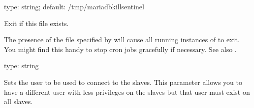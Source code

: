\documentclass[letterpaper,10pt,english]{sphinxmanual}
\begin{document}

\begin{fulllineitems}
\label{\detokenize{mariadb-kill:cmdoption-mariadb-kill-sentinel}}
type: string; default: /tmp/mariadb\sphinxhyphen{}kill\sphinxhyphen{}sentinel

Exit if this file exists.

The presence of the file specified by {\hyperref[\detokenize{mariadb-kill:cmdoption-mariadb-kill-sentinel}]{}} will cause all
running instances of  to exit.  You might find this handy to stop cron
jobs gracefully if necessary.  See also {\hyperref[\detokenize{mariadb-kill:cmdoption-mariadb-kill-stop}]{}}.

\end{fulllineitems}


\begin{fulllineitems}
\label{\detokenize{mariadb-kill:cmdoption-mariadb-kill-slave-user}}
type: string

Sets the user to be used to connect to the slaves.
This parameter allows you to have a different user with less privileges on the
slaves but that user must exist on all slaves.

\end{fulllineitems}
\end{document}
